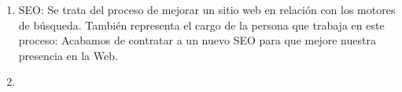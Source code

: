 



\begin{enumerate}
    \item SEO: Se trata del proceso de mejorar un sitio web en relación con los motores de búsqueda. También representa el cargo de la persona que trabaja en este proceso: Acabamos de contratar a un nuevo SEO para que mejore nuestra presencia en la Web. \cite{SEO}
    \item 
\end{enumerate}
